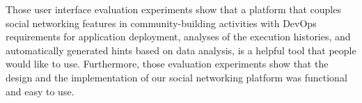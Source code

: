 Those user interface evaluation experiments show that a platform that couples social networking features in community-building activities with DevOps requirements for application deployment, analyses of the execution histories, and automatically generated hints based on data analysis, is a helpful tool that people would like to use. Furthermore, those evaluation experiments show that the design and the implementation of our social networking platform was functional and easy to use.